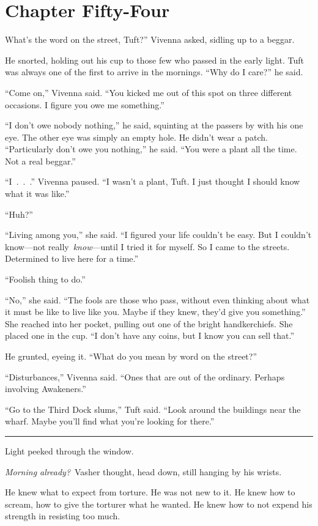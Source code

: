 \section{Chapter Fifty-Four}

What’s the word on the street, Tuft?” Vivenna asked, sidling up to a beggar.

He snorted, holding out his cup to those few who passed in the early light. Tuft was always one of the first to arrive in the mornings. “Why do I care?” he said.

“Come on,” Vivenna said. “You kicked me out of this spot on three different occasions. I figure you owe me something.”

“I don’t owe nobody nothing,” he said, squinting at the passers by with his one eye. The other eye was simply an empty hole. He didn’t wear a patch. “Particularly don’t owe you nothing,” he said. “You were a plant all the time. Not a real beggar.”

“I~.~.~.” Vivenna paused. “I wasn’t a plant, Tuft. I just thought I should know what it was like.”

“Huh?”

“Living among you,” she said. “I figured your life couldn’t be easy. But I couldn’t know—not really~\textit{know}—until I tried it for myself. So I came to the streets. Determined to live here for a time.”

“Foolish thing to do.”

“No,” she said. “The fools are those who pass, without even thinking about what it must be like to live like you. Maybe if they knew, they’d give you something.” She reached into her pocket, pulling out one of the bright handkerchiefs. She placed one in the cup. “I don’t have any coins, but I know you can sell that.”

He grunted, eyeing it. “What do you mean by word on the street?”

“Disturbances,” Vivenna said. “Ones that are out of the ordinary. Perhaps involving Awakeners.”

“Go to the Third Dock slums,” Tuft said. “Look around the buildings near the wharf. Maybe you’ll find what you’re looking for there.”

\bigskip \hrule \bigskip

Light peeked through the window.

\textit{Morning already?}~Vasher thought, head down, still hanging by his wrists.

He knew what to expect from torture. He was not new to it. He knew how to scream, how to give the torturer what he wanted. He knew how to not expend his strength in resisting too much.

